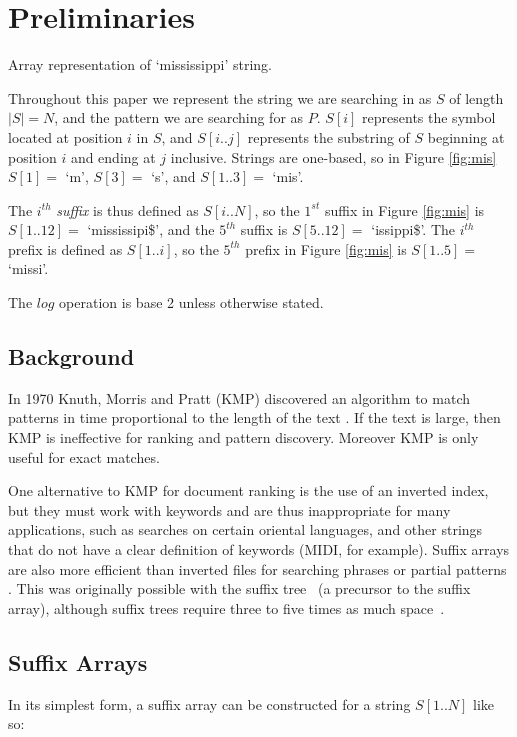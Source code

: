 \section{Preliminaries}
\label{sec:prelim}

			{Array representation of	`mississippi' string.}
			
Throughout this paper we represent the string we are searching in as $S$ of 
length 
$|S| = N$, and the pattern we are searching for as $P$. $S[i]$ represents the 
symbol located at position $i$ in $S$, and $S[i..j]$ represents the substring of 
$S$ beginning at position $i$ and ending at $j$ inclusive. Strings are 
one-based, so in Figure \ref{fig:mis} $S[1] = $ `m', $S[3] = $ `s', and $S[1..3] 
= $ `mis'.

The $i^{th}$ \emph{suffix} is thus defined as $S[i..N]$, so the $1^{st}$ suffix 
in Figure \ref{fig:mis} is $S[1..12] = $ `mississipi\$', and the $5^{th}$ suffix 
is $S[5..12] = $ `issippi\$'. The $i^{th}$ prefix is defined as $S[1..i]$, so
the $5^{th}$ prefix in Figure \ref{fig:mis} is $S[1..5] = $ `missi'.

The $log$ operation is base 2 unless otherwise stated.

\subsection{Background}
In 1970 Knuth, Morris and Pratt (KMP) discovered an algorithm to match patterns 
in time proportional to the length of the text \cite{knuth1977, 
mccreight1976}. If the text is large, then KMP is ineffective for ranking and 
pattern discovery. Moreover KMP is only useful for exact matches.

One alternative to KMP for document ranking is the use of an inverted index, but
they must work with keywords and are thus inappropriate for many applications,
such as searches on certain oriental languages, and other strings that do not
have a clear definition of keywords (MIDI, for example). Suffix arrays are also 
more efficient than inverted files for searching phrases or partial 
patterns \cite{marin2003, hon2009}. This was originally possible with the suffix 
tree~\cite{weiner1973, mccreight1976} (a precursor to the suffix array), 
although suffix trees require three to five times as much 
space~\cite{manber1993}.


\subsection{Suffix Arrays}
In its simplest form, a suffix array can be constructed for a string
$S[1..N]$ like so:

